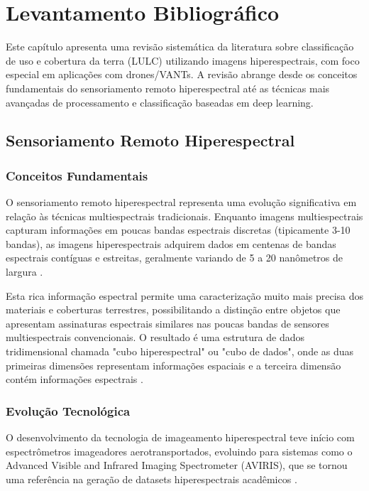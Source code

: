\chapter{Levantamento Bibliográfico}\label{chp:levantamento}

Este capítulo apresenta uma revisão sistemática da literatura sobre classificação de uso e cobertura da terra (LULC) utilizando imagens hiperespectrais, com foco especial em aplicações com drones/VANTs. A revisão abrange desde os conceitos fundamentais do sensoriamento remoto hiperespectral até as técnicas mais avançadas de processamento e classificação baseadas em deep learning.

\section{Sensoriamento Remoto Hiperespectral}\label{sec:hiperespectral}

\subsection{Conceitos Fundamentais}
O sensoriamento remoto hiperespectral representa uma evolução significativa em relação às técnicas multiespectrais tradicionais. Enquanto imagens multiespectrais capturam informações em poucas bandas espectrais discretas (tipicamente 3-10 bandas), as imagens hiperespectrais adquirem dados em centenas de bandas espectrais contíguas e estreitas, geralmente variando de 5 a 20 nanômetros de largura \cite{Lou2024}.

Esta rica informação espectral permite uma caracterização muito mais precisa dos materiais e coberturas terrestres, possibilitando a distinção entre objetos que apresentam assinaturas espectrais similares nas poucas bandas de sensores multiespectrais convencionais. O resultado é uma estrutura de dados tridimensional chamada "cubo hiperespectral" ou "cubo de dados", onde as duas primeiras dimensões representam informações espaciais e a terceira dimensão contém informações espectrais \cite{Lou2024}.

\subsection{Evolução Tecnológica}
O desenvolvimento da tecnologia de imageamento hiperespectral teve início com espectrômetros imageadores aerotransportados, evoluindo para sistemas como o Advanced Visible and Infrared Imaging Spectrometer (AVIRIS), que se tornou uma referência na geração de datasets hiperespectrais acadêmicos \cite{Lou2024}. 

